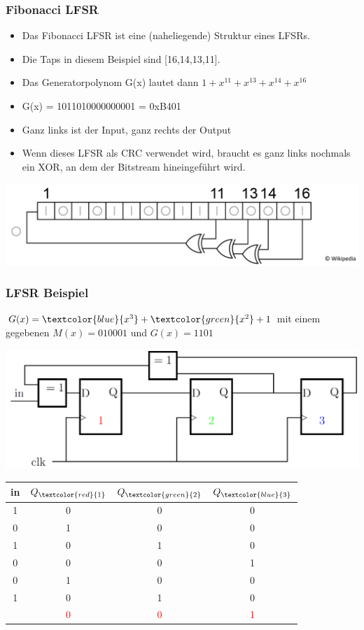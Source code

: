 \subsubsection{Fibonacci LFSR}
\begin{itemize}
	\item Das Fibonacci LFSR ist eine (naheliegende) Struktur eines LFSRs.
	\item Die Taps in diesem Beispiel sind [16,14,13,11].
	\item Das Generatorpolynom G(x) lautet dann $1 + x^{11} + x^{13} + x^{14} + x^{16}$
	\item G(x) = 1011010000000001 = 0xB401
	\item Ganz links ist der Input, ganz rechts der Output
	\item Wenn dieses LFSR als CRC verwendet wird, braucht es ganz links nochmals ein XOR, an dem der Bitstream hineingeführt wird.
\end{itemize}
\includegraphics[width=0.6\linewidth]{images/CRC/lfsr.png}
\subsubsection{LFSR Beispiel}
$G(x)=\textcolor{blue}{x^3}+ \textcolor{green}{x^2} + 1$ mit einem gegebenen $M(x)= 010001$ und $G(x)= 1101$


\begin{minipage}{\linewidth}
	\begin{minipage}[b]{0.7\linewidth}
		\centering
		\includegraphics[width=0.7\linewidth]{images/CRC/ff-LFSR.png}
    \vfill\null
	\end{minipage}
	\begin{minipage}[b]{0.29\linewidth}
		\centering
\renewcommand{\arraystretch}{1}

\begin{tabular}{cccc}
	in	& $Q_{\textcolor{red}{1}}$	& $Q_{\textcolor{green}{2}}$	& $Q_{\textcolor{blue}{3}}$	\\
	\hline
	1 	& 	0 	& 	0 	& 	0 	\\
	0 	& 	1 	& 	0 	& 	0 	\\
	1 	& 	0 	& 	1 	& 	0 	\\
	0 	& 	0 	& 	0 	& 	1 	\\
	0 	& 	1 	& 	0 	& 	0 	\\
	1 	& 	0 	& 	1 	& 	0 	\\
	\hline
	& 	\textcolor{red}{0} 	& 	\textcolor{red}{0} 	& 	\textcolor{red}{1}  	\\
\end{tabular}
\vfill\null
	\end{minipage}
\end{minipage}


